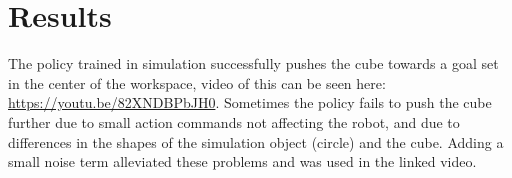 \section{Results}

The policy trained in simulation successfully pushes the cube towards a goal
set in the center of the workspace, video of this can be seen here:
\url{https://youtu.be/82XNDBPbJH0}. Sometimes the policy fails to push the cube
further due to small action commands not affecting the robot, and due to
differences in the shapes of the simulation object (circle) and the cube.
Adding a small noise term alleviated these problems and was used in the linked
video.
